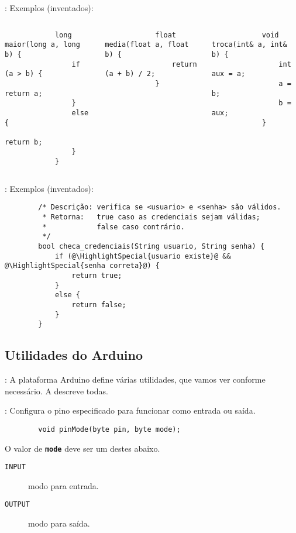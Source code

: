 \begin{frame}[fragile]{\insertsection: \insertsubsection}
	Exemplos (inventados):
	\begin{columns}[t]
		\begin{verbatim}
			long maior(long a, long b) {
				if (a > b) {
					return a;
				}
				else {
					return b;
				}
			}
		\end{verbatim}

		\begin{verbatim}
			float media(float a, float b) {
				return (a + b) / 2;
			}
		\end{verbatim}

		\vspace{-\medskipamount}
		\begin{verbatim}
			void troca(int& a, int& b) {
				int aux = a;
				a = b;
				b = aux;
			}
		\end{verbatim}
	\end{columns}
\end{frame}


\begin{frame}[fragile]{\insertsection: \insertsubsection}
	Exemplos (inventados):
	\begin{verbatim}
		/* Descrição: verifica se <usuario> e <senha> são válidos.
		 * Retorna:   true caso as credenciais sejam válidas;
		 *            false caso contrário.
		 */
		bool checa_credenciais(String usuario, String senha) {
			if (@\HighlightSpecial{usuario existe}@ && @\HighlightSpecial{senha correta}@) {
				return true;
			}
			else {
				return false;
			}
		}
	\end{verbatim}
\end{frame}


\subsection{Utilidades do Arduino}


\begin{frame}{\insertsection: \insertsubsection}
	A plataforma Arduino define várias utilidades, que vamos ver conforme necessário. A  descreve todas.
\end{frame}


\begin{frame}[fragile]{\insertsection: \insertsubsection}
	Configura o pino especificado para funcionar como entrada ou saída.
	\begin{verbatim}
		void pinMode(byte pin, byte mode);
	\end{verbatim}

	O valor de \texttt{\textbf{mode}} deve ser um destes abaixo.
	\begin{description}
		\item[\texttt{INPUT}] modo para entrada.
		\item[\texttt{OUTPUT}] modo para saída.
	\end{description}
\end{frame}


